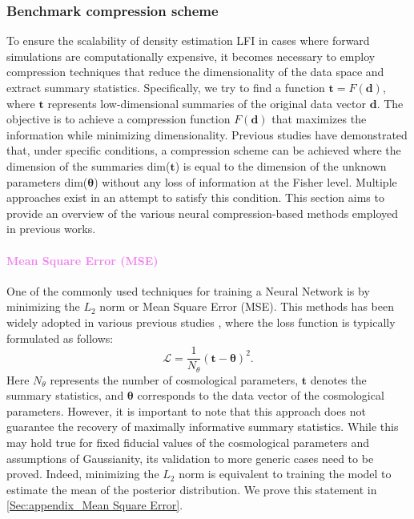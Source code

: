 \documentclass{aa}
\begin{document}
\subsubsection{Benchmark compression scheme}
To ensure the scalability of density estimation LFI in cases where forward simulations are computationally expensive, it becomes necessary to employ compression techniques that reduce the dimensionality of the data space and extract summary statistics. 
Specifically, we try to find a function $\bm{t}=F(\bm{d})$, where $\bm{t}$ represents low-dimensional summaries of the original data vector $\bm{d}$. The objective is to achieve a compression function $F(\bm{d})$ that maximizes the information while minimizing dimensionality. Previous studies \citep{alsing2018generalized} have demonstrated that, under specific conditions, a compression scheme can be achieved where the dimension of the summaries dim($\bm{t}$) is equal to the dimension of the unknown parameters dim($\bm{\theta}$) without any loss of information at the Fisher level. Multiple approaches exist in an attempt to satisfy this condition. This section aims to provide an overview of the various neural compression-based methods employed in previous works.





\paragraph{\textcolor{violet}{Mean Square Error (MSE)}}
One of the commonly used techniques for training a Neural Network is by minimizing the $L_2$ norm or Mean Square Error (MSE).
This methods has been widely adopted in various previous studies  \citep{ribli2018improved, lu2022simultaneously, lu2023cosmological}, where the loss function is typically formulated as follows:
\begin{equation}
   \mathcal{L}=\frac{1}{N_{\theta}}(\bm{t}-\bm{\theta})^2.
\end{equation}
Here $N_{\theta}$ represents the number of cosmological parameters, $\bm{t}$ denotes the summary statistics, and $\bm{\theta}$ corresponds to the data vector of the cosmological parameters. 
However, it is important to note that this approach does not guarantee the recovery of maximally informative summary statistics. While this may hold true for fixed fiducial values of the cosmological parameters and assumptions of Gaussianity, its validation to more generic cases need to be proved. Indeed, minimizing the $L_{2}$ norm is equivalent to training the model to estimate the mean of the posterior distribution. We prove this statement in \autoref{Sec:appendix_Mean Square Error}.
\end{document}
